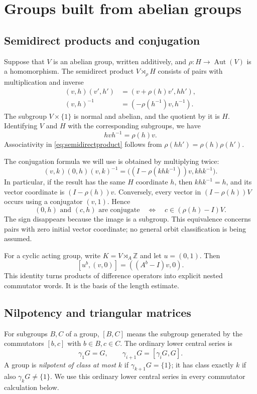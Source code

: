 \documentclass[11pt]{article}
\numberwithin{equation}{section}
\theoremstyle{definition}
\theoremstyle{remark}
\newcommand{\Z}{\mathbb Z}
\begin{document}
\section{Groups built from abelian groups}\label{sec:groupbackground}
\subsection{Semidirect products and conjugation}
Suppose that $V$ is an abelian group, written additively, and $\rho:H\to\operatorname{Aut}(V)$ is a homomorphism. The semidirect product $V\rtimes_\rho H$ consists of pairs with multiplication and inverse
\begin{align}
(v,h)(v',h')&=(v+\rho(h)v',hh'),\label{eq:semidirectproduct}\\
(v,h)^{-1}&=(-\rho(h^{-1})v,h^{-1}).\label{eq:semidirectinverse}
\end{align}
The subgroup $V\times\{1\}$ is normal and abelian, and the quotient by it is $H$. Identifying $V$ and $H$ with the corresponding subgroups, we have
\[
hvh^{-1}=\rho(h)v.
\]
Associativity in \eqref{eq:semidirectproduct} follows from $\rho(hh')=\rho(h)\rho(h')$.

The conjugation formula we will use is obtained by multiplying twice:
\begin{equation}\label{eq:generalconjugation}
(v,k)(0,h)(v,k)^{-1}
=\bigl((I-\rho(khk^{-1}))v,khk^{-1}\bigr).
\end{equation}
In particular, if the result has the same $H$ coordinate $h$, then $khk^{-1}=h$, and its vector coordinate is $(I-\rho(h))v$. Conversely, every vector in $(I-\rho(h))V$ occurs using a conjugator $(v,1)$. Hence
\begin{equation}\label{eq:conjugacyimage}
(0,h)\text{ and }(c,h)\text{ are conjugate}
\quad\Longleftrightarrow\quad c\in(\rho(h)-I)V.
\end{equation}
The sign disappears because the image is a subgroup. This equivalence concerns pairs with zero initial vector coordinate; no general orbit classification is being assumed.

For a cyclic acting group, write $K=V\rtimes_A\Z$ and let $u=(0,1)$. Then
\begin{equation}\label{eq:commutatorvector}
[u^b,(v,0)]=((A^b-I)v,0).
\end{equation}
This identity turns products of difference operators into explicit nested commutator words. It is the basis of the length estimate.

\subsection{Nilpotency and triangular matrices}
For subgroups $B,C$ of a group, $[B,C]$ means the subgroup generated by the commutators $[b,c]$ with $b\in B,c\in C$. The ordinary lower central series is
\[
\gamma_1G=G,\qquad \gamma_{i+1}G=[\gamma_iG,G].
\]
A group is \emph{nilpotent of class at most $k$} if $\gamma_{k+1}G=\{1\}$; it has class exactly $k$ if also $\gamma_kG\ne\{1\}$. We use this ordinary lower central series in every commutator calculation below.
\end{document}
